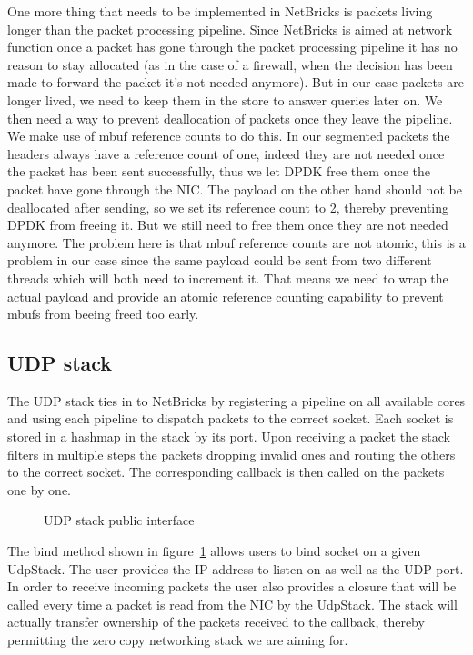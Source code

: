 \documentclass[11pt]{book}
\begin{document}
One more thing that needs to be implemented in NetBricks is packets
living longer than the packet processing pipeline. Since NetBricks is
aimed at network function once a packet has gone through the packet
processing pipeline it has no reason to stay allocated (as in the case
of a firewall, when the decision has been made to forward the packet
it's not needed anymore). But in our case packets are longer lived, we
need to keep them in the store to answer queries later on. We then
need a way to prevent deallocation of packets once they leave the
pipeline. We make use of mbuf reference counts to do this. In our
segmented packets the headers always have a reference count of one,
indeed they are not needed once the packet has been sent successfully,
thus we let DPDK free them once the packet have gone through the
NIC\@. The payload on the other hand should not be deallocated after
sending, so we set its reference count to 2, thereby preventing DPDK
from freeing it. But we still need to free them once they are not
needed anymore. The problem here is that mbuf reference counts are not
atomic, this is a problem in our case since the same payload could be
sent from two different threads which will both need to increment
it. That means we need to wrap the actual payload and provide an
atomic reference counting capability to prevent mbufs from beeing
freed too early.

\subsection{UDP stack}

The UDP stack ties in to NetBricks by registering a pipeline on all
available cores and using each pipeline to dispatch packets to the
correct socket. Each socket is stored in a hashmap in the stack by its
port. Upon receiving a packet the stack filters in multiple steps the
packets dropping invalid ones and routing the others to the correct
socket. The corresponding callback is then called on the packets one
by one.

\begin{figure}[htb!]
  
  \label{code:socket-registration}
  \caption{UDP stack public interface}
\end{figure}

The bind method shown in figure~\ref{code:socket-registration} allows
users to bind socket on a given UdpStack. The user provides the IP
address to listen on as well as the UDP port. In order to receive
incoming packets the user also provides a closure that will be called
every time a packet is read from the NIC by the UdpStack. The stack
will actually transfer ownership of the packets received to the
callback, thereby permitting the zero copy networking stack we are
aiming for.
\end{document}
